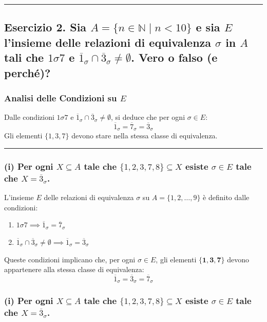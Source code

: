 \vspace{0.5cm}
\hrule
\vspace{0.5cm}

\subsection*{Esercizio 2. Sia $A = \{n \in \mathbb{N} \mid n < 10\}$ e sia $E$ l'insieme delle relazioni di equivalenza $\sigma$ in $A$ tali che $1 \sigma 7$ e $\overline{1}_{\sigma} \cap \overline{3}_{\sigma} \neq \emptyset$. Vero o falso (e perché)?}

\subsubsection*{Analisi delle Condizioni su $E$}
Dalle condizioni $1 \sigma 7$ e $\overline{1}_{\sigma} \cap \overline{3}_{\sigma} \neq \emptyset$, si deduce che per ogni $\sigma \in E$:
$$ \overline{1}_{\sigma} = \overline{7}_{\sigma} = \overline{3}_{\sigma} $$
Gli elementi $\{1, 3, 7\}$ devono stare nella stessa classe di equivalenza.

\vspace{0.3cm}
\hrule
\vspace{0.3cm}

\subsubsection*{(i) Per ogni $X \subseteq A$ tale che $\{1, 2, 3, 7, 8\} \subseteq X$ esiste $\sigma \in E$ tale che $X = \overline{3}_{\sigma}$.}

L'insieme $E$ delle relazioni di equivalenza $\sigma$ su $A = \{1, 2, \dots, 9\}$ è definito dalle condizioni:
\begin{enumerate}
    \item $1 \sigma 7 \implies \overline{1}_{\sigma} = \overline{7}_{\sigma}$
    \item $\overline{1}_{\sigma} \cap \overline{3}_{\sigma} \neq \emptyset \implies \overline{1}_{\sigma} = \overline{3}_{\sigma}$
\end{enumerate}
Queste condizioni implicano che, per ogni $\sigma \in E$, gli elementi $\mathbf{\{1, 3, 7\}}$ devono appartenere alla stessa classe di equivalenza:
$$ \overline{1}_{\sigma} = \overline{3}_{\sigma} = \overline{7}_{\sigma} $$

\subsubsection*{(i) Per ogni $X \subseteq A$ tale che $\{1, 2, 3, 7, 8\} \subseteq X$ esiste $\sigma \in E$ tale che $X = \overline{3}_{\sigma}$.}

